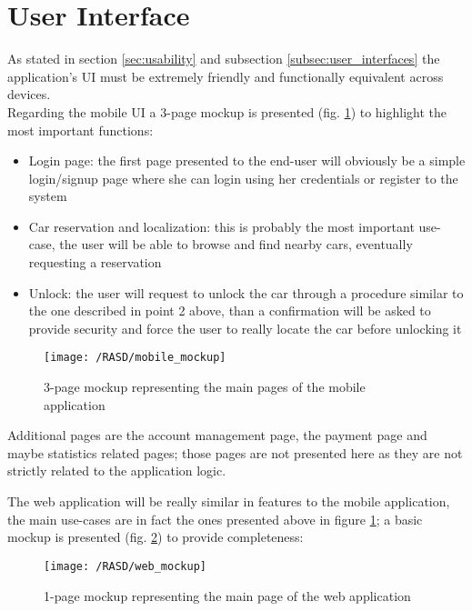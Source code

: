 \section{User Interface}
As stated in section \ref{sec:usability} and subsection \ref{subsec:user_interfaces} the application's UI must be extremely friendly and functionally equivalent across devices. 
\\Regarding the mobile UI a 3-page mockup is presented (fig. \ref{fig:mobile_mockup}) to highlight the most important functions: 
\begin{itemize}
	\item{Login page: the first page presented to the end-user will obviously be a simple login/signup page where she can login using her credentials or register to the system}
	\item{Car reservation and localization: this is probably the most important use-case, the user will be able to browse and find nearby cars, eventually requesting a reservation}
	\item{Unlock: the user will request to unlock the car through a procedure similar to the one described in point 2 above, than a confirmation will be asked to provide security and force the user to really locate the car before unlocking it}
\end{itemize}
\begin{figure}[!h]
	\centering
	\vspace{0.2cm}
	\texttt{[image: /RASD/mobile\_mockup]}\\ 
	\vspace{0.5cm}
	\caption{3-page mockup representing the main pages of the mobile application} \label{fig:mobile_mockup} 
\end{figure}
Additional pages are the account management page, the payment page and maybe statistics related pages; those pages are not presented here as they are not strictly related to the application logic.

The web application will be really similar in features to the mobile application, the main use-cases are in fact the ones presented above in figure \ref{fig:mobile_mockup}; a basic mockup is presented (fig. \ref{fig:web_mockup}) to provide completeness:
\begin{figure}[!h]
	\centering
	\vspace{0.2cm}{}
	\texttt{[image: /RASD/web\_mockup]}\\ 
	\vspace{0.5cm}
	\caption{1-page mockup representing the main page of the web application} \label{fig:web_mockup} 
\end{figure}
